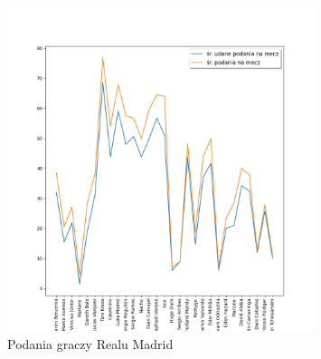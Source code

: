 \documentclass[12pt, letterpaper]{article}
\begin{document}
\pagebreak
\begin{figure}[ht]
    \centering
    \includegraphics[width=0.8\textwidth]{images/UCL_Real_passes.png}
    \caption{Podania graczy Realu Madrid}
    \label{fig:enter-label}
\end{figure}
\pagebreak
\end{document}
